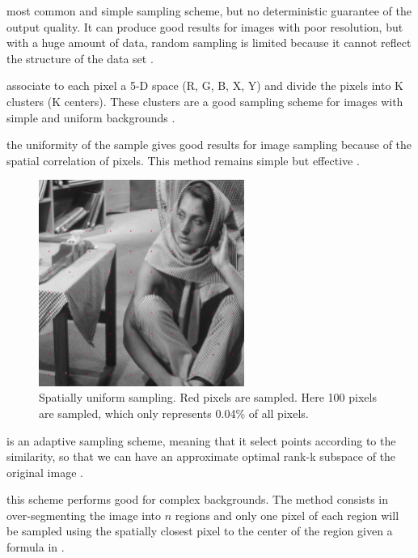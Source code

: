 \begin{description}[align=left]
 \item [Random sampling (RS)] most common and simple sampling scheme, but no deterministic guarantee of the output quality. It can produce good results for images with poor resolution, but with a huge amount of data, random sampling is limited because it cannot reflect the structure of the data set \cite{zhan_improved_2017}.
 \item [K-means sampling (KS)] associate to each pixel a 5-D space (R, G, B, X, Y) and divide the pixels into K clusters (K centers). These clusters are a good sampling scheme for images with simple and uniform backgrounds \cite{kao_sampling_2012} \cite{zhang_improved_2008}.
 \item [Uniform spatially sampling] the uniformity of the sample gives good results for image sampling because of the spatial correlation of pixels. This method remains simple but effective \cite{glide_2014}.
  \begin{figure}[H]
      \centering
      \includegraphics[width=0.6\textwidth]{img/spatiallyUniformSampling.png}
      \caption{Spatially uniform sampling. Red pixels are sampled. Here 100 pixels are sampled, which only represents 0.04\% of all pixels.}
  \end{figure}
 \item [Incremental sampling (INS)] is an adaptive sampling scheme, meaning that it select points according to the similarity, so that we can have an approximate optimal rank-k subspace of the original image \cite{zhan_improved_2017}.
 \item [Mean-shift segmentation-based sampling] this scheme performs good for complex backgrounds. The method consists in over-segmenting the image into \(n\) regions and only one pixel of each region will be sampled using the spatially closest pixel to the center of the region given a formula in \cite{kao_sampling_2012}.
\end{description}

